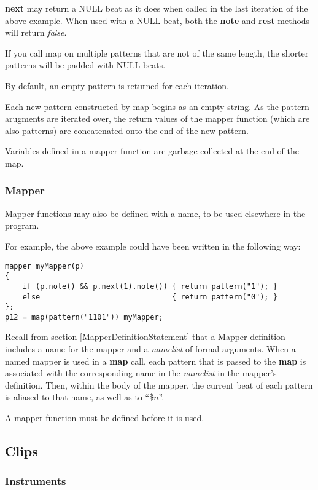 \textbf{next} may return a NULL beat as it does when called in the last iteration of the above example.  When used with a NULL beat, both the \textbf{note} and \textbf{rest} methods will return \textit{false}.

If you call map on multiple patterns that are not of the same length, the shorter patterns will be padded with NULL beats.

By default, an empty pattern is returned for each iteration.

Each new pattern constructed by map begins as an empty string.  As the pattern arugments are iterated over, the return values of the mapper function (which are also patterns) are concatenated onto the end of the new pattern.

Variables defined in a mapper function are garbage collected at the end of the map.

\subsubsection{Mapper}

Mapper functions may also be defined with a name, to be used elsewhere in the program.

For example, the above example could have been written in the following way:
\begin{verbatim}
mapper myMapper(p)
{
    if (p.note() && p.next(1).note()) { return pattern("1"); }
    else                              { return pattern("0"); }
};
p12 = map(pattern("1101")) myMapper;
\end{verbatim}

Recall from section \ref{MapperDefinitionStatement} that a  Mapper definition includes a name for the mapper and  a \emph{namelist} of formal arguments.
When a named mapper is used in a \textbf{map} call, each pattern that is passed to the \textbf{map} is associated with the corresponding name in the \emph{namelist} in the mapper's definition.
Then, within the body of the mapper, the current beat of each pattern is aliased to that name, as well as to ``\$$n$''.

A mapper function must be defined before it is used.

\subsection{Clips}

\subsubsection{Instruments}\label{instrSection}

